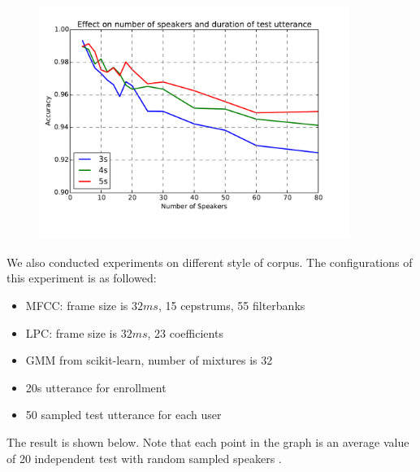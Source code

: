 \begin{figure}[H]
  \centering
  \includegraphics[width=0.9\textwidth]{img/performance.pdf}
\end{figure}

We also conducted experiments on different style of corpus.
The configurations of this experiment is as followed:
\begin{itemize}
  \item MFCC: frame size is $32 ms $, 15 cepstrums, 55 filterbanks
  \item LPC: frame size is $32 ms $, 23 coefficients
  \item GMM from scikit-learn, number of mixtures is 32
  \item 20s utterance for enrollment
  \item 50 sampled test utterance for each user
\end{itemize}

The result is shown below. Note that each point in the graph is an
average value of 20 independent test with random sampled speakers .

